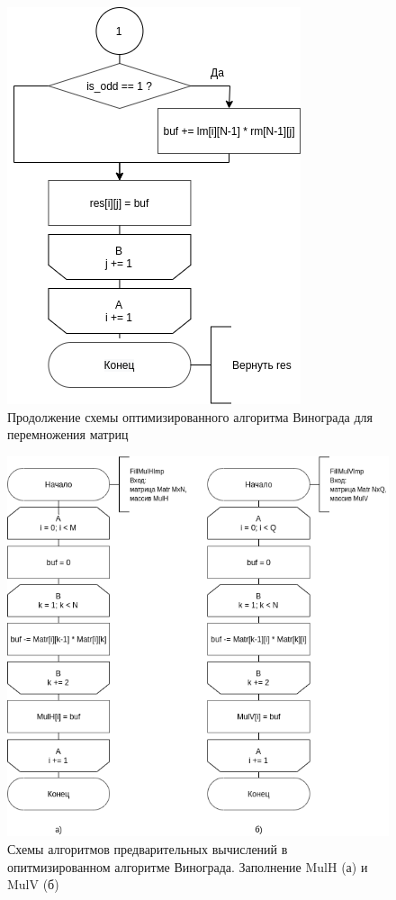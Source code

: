 \begin{figure}[!htb]
	\centering
	\includegraphics[scale=0.6]{schemes/win-imp-bottom}
	\caption{Продолжение схемы оптимизированного алгоритма Винограда для перемножения матриц}
	\label{scheme:win-imp-bottom}
\end{figure}


\begin{figure}[!htb]
	\centering
	\includegraphics[scale=0.6]{schemes/fillmul-imp}
	\caption{Схемы алгоритмов предварительных вычислений в опитмизированном алгоритме Винограда. Заполнение MulH (а) и MulV (б)}
	\label{scheme:fillmul-imp}
\end{figure}

